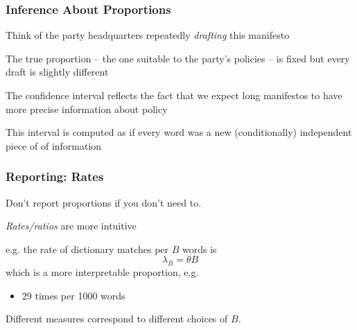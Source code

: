 \documentclass[11pt,compress,professionalfonts]{beamer}
\newcommand{\ita}{\begin{itemize}}
\newcommand{\itm}{\item[]}
\newcommand{\itz}{\end{itemize}}
\begin{document}
\begin{frame}[t]\frametitle{Inference About Proportions}

Think of the party headquarters repeatedly \textsl{drafting} this manifesto

The true proportion -- the one suitable to the party's policies -- is fixed but every draft is slightly different

The confidence interval reflects the fact that we expect long manifestos to have more precise information about policy

This interval is computed as if every word was a new (conditionally) independent piece of of information

\end{frame}
\begin{frame}[t]\frametitle{Reporting: Rates}

Don't report proportions if you don't need to.

\textsl{Rates/ratios} are more intuitive

e.g. the rate of dictionary matches per $B$ words is
\[
\lambda_B = \theta B
\]
which is a more interpretable proportion,
e.g.
\ita
\itm 29 times per 1000 words
\itz
Different measures correspond to different choices of $B$.

%
%
%
%
%
%


\end{frame}
\end{document}
